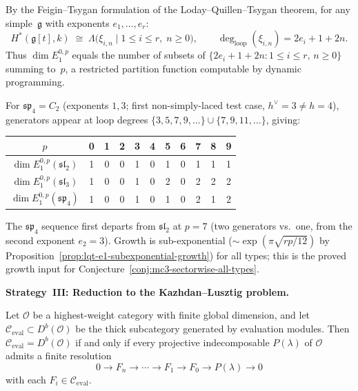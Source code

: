 \begin{computation}
\label{comp:current-algebra-E1-all-types}
By the Feigin--Tsygan formulation of the
Loday--Quillen--Tsygan theorem, for any simple~$\mathfrak{g}$
with exponents $e_1, \ldots, e_r$:
\[
H^*(\mathfrak{g}[t], k)
\;\cong\;
\Lambda\bigl(\xi_{i,n} \mid
 1 \le i \le r,\; n \ge 0\bigr),
\qquad
\deg_{\mathrm{loop}}(\xi_{i,n}) = 2e_i + 1 + 2n.
\]
Thus $\dim E_1^{0,p}$ equals the number of subsets
of $\{2e_i + 1 + 2n : 1 \le i \le r,\, n \ge 0\}$
summing to~$p$, a restricted partition function computable
by dynamic programming.

For $\mathfrak{sp}_4 = C_2$ (exponents $1, 3$;
first non-simply-laced test case,
$h^\vee = 3 \neq h = 4$), generators appear at loop degrees
$\{3, 5, 7, 9, \ldots\} \cup \{7, 9, 11, \ldots\}$, giving:
\begin{center}
\begin{tabular}{c|cccccccccc}
$p$ & 0 & 1 & 2 & 3 & 4 & 5 & 6 & 7 & 8 & 9 \\
\hline
$\dim E_1^{0,p}(\mathfrak{sl}_2)$
 & 1 & 0 & 0 & 1 & 0 & 1 & 0 & 1 & 1 & 1 \\
$\dim E_1^{0,p}(\mathfrak{sl}_3)$
 & 1 & 0 & 0 & 1 & 0 & 2 & 0 & 2 & 2 & 2 \\
$\dim E_1^{0,p}(\mathfrak{sp}_4)$
 & 1 & 0 & 0 & 1 & 0 & 1 & 0 & 2 & 1 & 2 \\
\end{tabular}
\end{center}
The $\mathfrak{sp}_4$ sequence first departs from
$\mathfrak{sl}_2$ at $p = 7$ (two generators vs.\ one,
from the second exponent $e_2 = 3$). Growth is sub-exponential
($\sim \exp(\pi\sqrt{rp/12})$ by
Proposition~\ref{prop:lqt-e1-subexponential-growth})
for all types; this is the proved growth input for
Conjecture~\textup{\ref{conj:mc3-sectorwise-all-types}}.
\end{computation}

\medskip

\noindent\textbf{Strategy~III\@: Reduction to the
Kazhdan--Lusztig problem.}

\begin{proposition}
\label{prop:thick-gen-projective}
Let $\mathcal{O}$ be a highest-weight category with finite global
dimension, and let $\mathcal{C}_{\mathrm{eval}} \subset
D^b(\mathcal{O})$ be the thick subcategory generated by evaluation
modules. Then $\mathcal{C}_{\mathrm{eval}} = D^b(\mathcal{O})$ if
and only if every projective indecomposable $P(\lambda)$ of
$\mathcal{O}$ admits a finite resolution
\begin{equation}\label{eq:proj-eval-resolution}
0 \to F_n \to \cdots \to F_1 \to F_0 \to P(\lambda) \to 0
\end{equation}
with each $F_i \in \mathcal{C}_{\mathrm{eval}}$.
\end{proposition}

